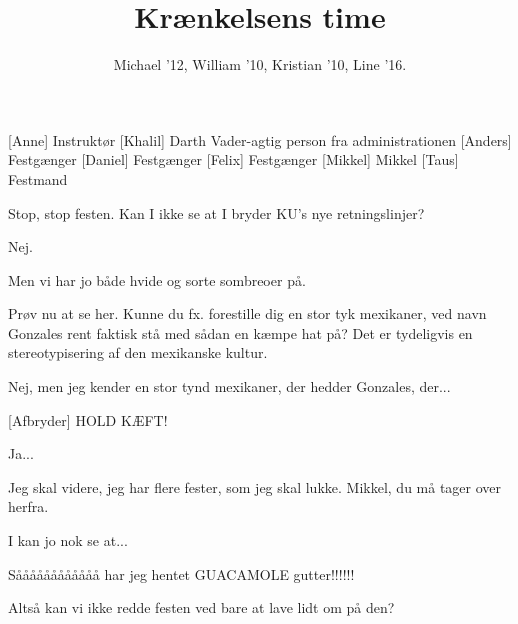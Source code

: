 \documentclass[a4paper,11pt]{article}
\title{Krænkelsens time}
\author{Michael '12, William '10, Kristian '10, Line '16.}
\begin{document}
\maketitle

\begin{roles}
[Anne] Instruktør
[Khalil] Darth Vader-agtig person fra administrationen
[Anders] Festgænger
[Daniel] Festgænger
[Felix] Festgænger
[Mikkel] Mikkel
[Taus] Festmand
\end{roles}

\begin{props}
\end{props}

\begin{sketch}


 Stop, stop festen. Kan I ikke se at I bryder KU's nye retningslinjer?



 Nej.

 Men vi har jo både hvide og sorte sombreoer på.

 Prøv nu at se her. Kunne du fx. forestille dig en stor tyk mexikaner, ved navn Gonzales rent faktisk stå med sådan en kæmpe hat på? Det er tydeligvis en stereotypisering af den mexikanske kultur.

 Nej, men jeg kender en stor tynd mexikaner, der hedder Gonzales, der...

[Afbryder] HOLD KÆFT! 

 Ja...

 Jeg skal videre, jeg har flere fester, som jeg skal lukke. Mikkel, du må tager over herfra.

 I kan jo nok se at...


 Såååååååååååå har jeg hentet GUACAMOLE gutter!!!!!!

  Altså kan vi ikke redde festen ved bare at lave lidt om på den?


\end{sketch}
\end{document}
